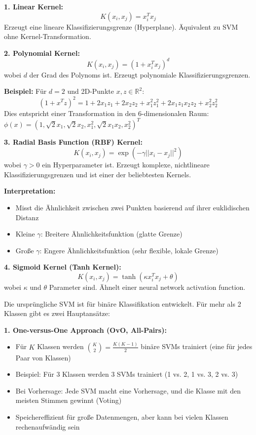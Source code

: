 
\textbf{1. Linear Kernel:}
$$K(x_i, x_j) = x_i^T x_j$$
Erzeugt eine lineare Klassifizierungsgrenze (Hyperplane). Äquivalent zu SVM ohne Kernel-Transformation.

\textbf{2. Polynomial Kernel:}
$$K(x_i, x_j) = (1 + x_i^T x_j)^d$$
wobei $d$ der Grad des Polynoms ist. Erzeugt polynomiale Klassifizierungsgrenzen.

\textbf{Beispiel:} Für $d = 2$ und 2D-Punkte $x, z \in \mathbb{R}^2$:
$$(1 + x^T z)^2 = 1 + 2x_1z_1 + 2x_2z_2 + x_1^2 z_1^2 + 2x_1z_1 x_2z_2 + x_2^2 z_2^2$$
Dies entspricht einer Transformation in den 6-dimensionalen Raum: $\phi(x) = (1, \sqrt{2}x_1, \sqrt{2}x_2, x_1^2, \sqrt{2}x_1x_2, x_2^2)^T$

\textbf{3. Radial Basis Function (RBF) Kernel:}
$$K(x_i, x_j) = \exp\left(-\gamma ||x_i - x_j||^2\right)$$
wobei $\gamma > 0$ ein Hyperparameter ist. Erzeugt komplexe, nichtlineare Klassifizierungsgrenzen und ist einer der beliebtesten Kernels.

\textbf{Interpretation:}
\begin{itemize}[leftmargin=1.5em]
    \item Misst die Ähnlichkeit zwischen zwei Punkten basierend auf ihrer euklidischen Distanz
    \item Kleine $\gamma$: Breitere Ähnlichkeitsfunktion (glatte Grenze)
    \item Große $\gamma$: Engere Ähnlichkeitsfunktion (sehr flexible, lokale Grenze)
\end{itemize}

\textbf{4. Sigmoid Kernel (Tanh Kernel):}
$$K(x_i, x_j) = \tanh(\kappa x_i^T x_j + \theta)$$
wobei $\kappa$ und $\theta$ Parameter sind. Ähnelt einer neural network activation function.

Die ursprüngliche SVM ist für binäre Klassifikation entwickelt. Für mehr als 2 Klassen gibt es zwei Hauptansätze:

\textbf{1. One-versus-One Approach (OvO, All-Pairs):}
\begin{itemize}[leftmargin=1.5em]
    \item Für $K$ Klassen werden $\binom{K}{2} = \frac{K(K-1)}{2}$ binäre SVMs trainiert (eine für jedes Paar von Klassen)
    \item Beispiel: Für 3 Klassen werden 3 SVMs trainiert (1 vs. 2, 1 vs. 3, 2 vs. 3)
    \item Bei Vorhersage: Jede SVM macht eine Vorhersage, und die Klasse mit den meisten Stimmen gewinnt (Voting)
    \item Speichereffizient für große Datenmengen, aber kann bei vielen Klassen rechenaufwändig sein
\end{itemize}

